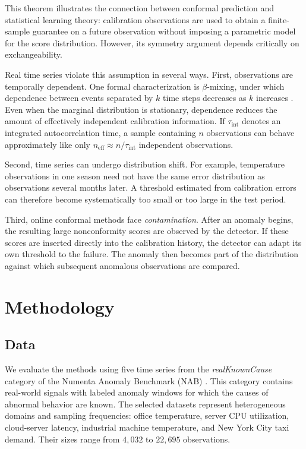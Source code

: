 \documentclass[11pt]{article}
\theoremstyle{definition}
\theoremstyle{remark}
\begin{document}
This theorem illustrates the connection between conformal prediction and statistical learning theory: calibration observations are used to obtain a finite-sample guarantee on a future observation without imposing a parametric model for the score distribution. However, its symmetry argument depends critically on exchangeability.

Real time series violate this assumption in several ways. First, observations are temporally dependent. One formal characterization is $\beta$-mixing, under which dependence between events separated by $k$ time steps decreases as $k$ increases \cite{bradley2005basic}. Even when the marginal distribution is stationary, dependence reduces the amount of effectively independent calibration information. If $\tau_{\mathrm{int}}$ denotes an integrated autocorrelation time, a sample containing $n$ observations can behave approximately like only $n_{\mathrm{eff}} \approx n/\tau_{\mathrm{int}}$ independent observations.

Second, time series can undergo distribution shift. For example, temperature observations in one season need not have the same error distribution as observations several months later. A threshold estimated from calibration errors can therefore become systematically too small or too large in the test period.

Third, online conformal methods face \emph{contamination}. After an anomaly begins, the resulting large nonconformity scores are observed by the detector. If these scores are inserted directly into the calibration history, the detector can adapt its own threshold to the failure. The anomaly then becomes part of the distribution against which subsequent anomalous observations are compared.



\section{Methodology}\label{sec:method}

\subsection{Data}

We evaluate the methods using five time series from the \emph{realKnownCause} category of the Numenta Anomaly Benchmark (NAB) \cite{lavin2015evaluating,ahmad2017unsupervised}. This category contains real-world signals with labeled anomaly windows for which the causes of abnormal behavior are known. The selected datasets represent heterogeneous domains and sampling frequencies: office temperature, server CPU utilization, cloud-server latency, industrial machine temperature, and New York City taxi demand. Their sizes range from $4{,}032$ to $22{,}695$ observations.
\end{document}
